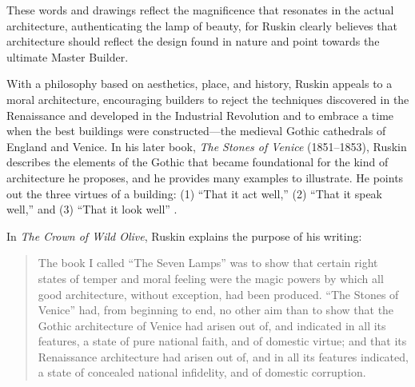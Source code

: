 
These words and drawings reflect the magnificence that resonates in the
actual architecture, authenticating the lamp of beauty, for Ruskin
clearly believes that architecture should reflect the design found in
nature and point towards the ultimate Master Builder.  

With a philosophy based on aesthetics, place, and history, Ruskin
appeals to a moral architecture, encouraging builders to reject the
techniques discovered in the Renaissance and developed in the
Industrial Revolution and to embrace a time when the best buildings
were constructed—the medieval Gothic cathedrals of England and Venice. 
In his later book, \textit{The Stones of Venice }(1851--1853), Ruskin
describes the elements of the Gothic that became foundational for the
kind of architecture he proposes, and he provides many examples to
illustrate.  He points out the three virtues of a building: (1) “That
it act well,” (2) “That it speak well,” and (3) “That it look well” \citep[][vol. 1, ch. 2, sec. 1]{ruskin1885}. 
 
In \textit{The Crown of Wild Olive}, Ruskin
explains the purpose of his writing: 


\begin{quote}
The book I called ``The Seven Lamps'' was to show that certain right
states of temper and moral feeling were the magic powers by which all
good architecture, without exception, had been produced. 
``The Stones of Venice'' had, from beginning to end, no
other aim than to show that the Gothic architecture of Venice had
arisen out of, and indicated in all its features, a state of pure
national faith, and of domestic virtue; and that its Renaissance
architecture had arisen out of, and in all its features indicated, a
state of concealed national infidelity, and of  domestic corruption. 
\citep[][p.~53]{ruskin1866}
\end{quote}

